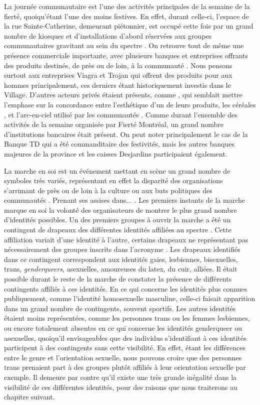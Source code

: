 La journée communautaire est l'une des activités principales de la semaine de la fierté, quoiqu’étant l'une des moins festives.
En effet, durant celle-ci, l'espace de la rue Sainte-Catherine, demeurant piétonnier, est occupé cette fois par un grand nombre de kiosques et d'installations d'abord réservées aux groupes communautaires gravitant au sein du spectre \lgbt.
On retrouve tout de même une présence commerciale importante, avec plusieurs banques et entreprises offrants des produits destinés, de près ou de loin, à la communauté \lgbt.
Nous pensons surtout aux entreprises Viagra et Trojan qui offrent des produits pour aux hommes principalement, ces derniers étant historiquement investis dans le Village.
D'autres acteurs privés étaient présents, comme , qui semblait mettre l'emphase sur la concordance entre l'esthétique d'un de leurs produits, les céréales , et l'arc-en-ciel utilisé par les communautés \lgbt.
Comme durant l'ensemble des activités de la semaine organisée par Fierté Montréal, un grand nombre d'institutions bancaires était présent.
On peut noter principalement le cas de la Banque TD qui a été commanditaire des festivités, mais les autres banques majeures de la province et les caisses Desjardins participaient également.

La marche en soi est un événement mettant en scène un grand nombre de symboles très variés, représentant en effet la disparité des organisations s'arrimant de près ou de loin à la culture ou aux buts politiques des communautés \lgbt.
Prenant ses assises dans... .
Les premiers instants de la marche marque en soi la volonté des organisateurs de montrer le plus grand nombre d'identités possibles.
Un des premiers groupes à ouvrir la marche a été un contingent de drapeaux des différentes identités affiliées au spectre \lgbt{}.
Cette affiliation variait d'une identité à l'autre, certains drapeaux ne représentant pas nécessairement des groupes inscrits dans l'acronyme \lgbt.
Les drapeaux identifiés dans ce contingent correspondent aux identités gaies, lesbiennes, bisexuelles, trans, \emph{genderqueers}, asexuelles, amoureuses du latex, du cuir, alliées.
Il était possible durant le reste de la marche de constater la présence de différents contingents affiliés à ces identités.
En ce qui concerne les identités plus connues publiquement, comme l'identité homosexuelle masculine, celle-ci faisait apparition dans un grand nombre de contingents, souvent sportifs.
Les autres identités étaient moins représentées, comme les personnes trans ou les femmes lesbiennes, ou encore totalement absentes en ce qui concerne les identités genderqueer ou asexuelles, quoiqu'il envisageables que des individus s'identifiant à ces identités participent à des contingents sans cette visibilité.
En effet, étant les différences entre le genre et l'orientation sexuelle, nous pouvons croire que des personnes trans prenaient part à des groupes plutôt affiliés à leur orientation sexuelle par exemple.
Il demeure par contre qu'il existe une très grande inégalité dans la visibilité de ces différentes identités, pour des raisons que nous traiterons au chapitre suivant.

